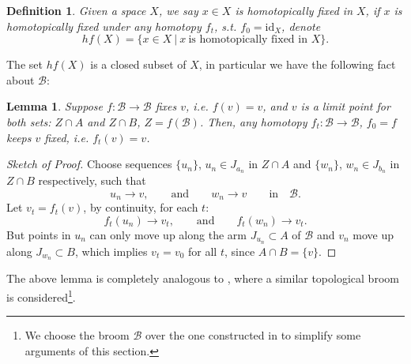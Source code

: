 \documentclass[reqno,12pt]{amsart}
\newtheorem{lemma}[theorem]{Lemma}
\theoremstyle{ourremark}
\newtheorem{definition}[theorem]{Definition}
\numberwithin{equation}{section}
\numberwithin{theorem}{section}
\begin{document}
\begin{definition}\label{def:h.f.}
Given a space $X$, we say $x\in X$ is {\em homotopically fixed in $X$}, if $x$ is homotopically fixed under any homotopy $f_t$, s.t. $f_0=\text{id}_X$, denote
\begin{equation}\label{eq:hf(X)}
 hf(X)=\{x\in X\ |\ x\ \text{is  homotopically fixed in $X$}\}.
\end{equation}
\end{definition}
{\noindent} The set $hf(X)$ is a closed subset of $X$, in particular we have the following fact about $\mathcal{B}$:

\begin{lemma}\label{lem:v-fixed-B}
 Suppose $f:\mathcal{B}\longrightarrow \mathcal{B}$ fixes $v$, i.e. $f(v)=v$, and $v$ is a limit point for both sets: $Z \cap A$ and $Z \cap B$, $Z=f(\mathcal{B})$. Then, any homotopy $f_t:\mathcal{B}\longrightarrow \mathcal{B}$, $f_0=f$ keeps $v$ fixed, i.e. $f_t(v)=v$.
\end{lemma}
\begin{proof}[Sketch of Proof]
 Choose sequences $\{u_n\}$, $u_n\in J_{a_n}$ in $Z\cap A$  and $\{w_n\}$, $w_n\in J_{b_n}$ in $Z\cap B$ respectively, such that
 \[
  u_n\longrightarrow v,\qquad\text{and}\qquad w_n\longrightarrow v\qquad \text{in}\quad \mathcal{B}.
 \]
{\noindent} Let $v_t=f_t(v)$, by continuity, for each $t$:
\[
  f_t(u_n)\longrightarrow v_t,\qquad\text{and}\qquad f_t(w_n)\longrightarrow v_t.
 \]
	{\noindent} But points in $u_n$ can only move up along the arm $J_{u_n}\subset A$ of $\mathcal{B}$ and $v_n$ move up along $J_{w_n}\subset B$, which implies $v_t=v_0$ for all $t$, since $A\cap B=\{v\}$.
\end{proof}

{\noindent} The above lemma is completely analogous to \cite[Lemma 2.3]{Karimov-Repovs-Rosicki-Zastrow05}, where a similar topological broom  is considered\footnote{We choose the broom $\mathcal{B}$ over the one constructed in \cite{Karimov-Repovs-Rosicki-Zastrow05} to simplify some arguments of this section.}.
\end{document}
